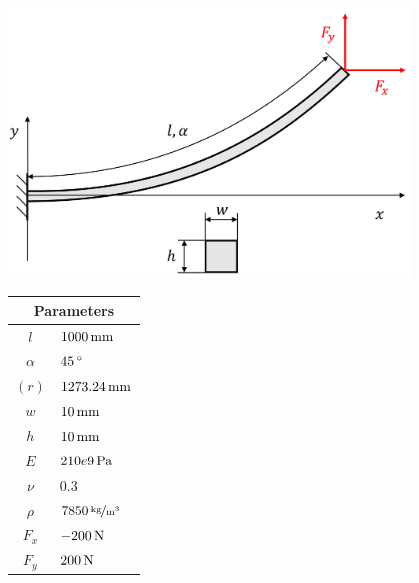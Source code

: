 \begin{minipage}{\textwidth}
	\begin{minipage}[b]{0.7\textwidth}
		\centering
		\includegraphics[width=0.8\textwidth]{figures/verification/reference-beam-3}
	\end{minipage}
	\hfill
	\begin{minipage}[b]{0.29\textwidth}
		\centering
		\begin{tabular}{|cl|}
			\hline
			\multicolumn{2}{|c|}{Parameters} \\
			\hline
			$l$ & $\unit[1000]{mm}$ \\
			$\alpha$ & $\unit[45]{^\circ}$ \\
			$(r)$ & $\unit[1273.24]{mm}$ \\
			$w$ & $\unit[10]{mm}$ \\
			$h$ & $\unit[10]{mm}$ \\
			$E$ & $\unit[210e9]{Pa}$ \\
			$\nu$ & $0.3$ \\
			$\rho$ & $\unitfrac[7850]{kg}{m^3}$ \\
			$F_x$ & $\unit[-200]{N}$ \\
			$F_y$ & $\unit[200]{N}$ \\
			\hline
		\end{tabular}
	\end{minipage}
\end{minipage}

